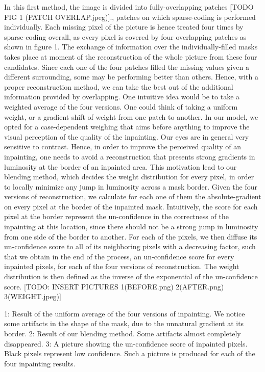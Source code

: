 In this first method, the image is divided into fully-overlapping patches [TODO FIG 1 (PATCH OVERLAP.jpeg)]., patches on which sparse-coding is performed individually. Each missing pixel of the picture is hence treated four times by sparse-coding overall, as every pixel is covered by four overlapping patches as shown in figure 1. 
The exchange of information over the individually-filled masks takes place at moment of the reconstruction of the whole picture from these four candidates. Since each one of the four patches filled the missing values given a different surrounding, some may be performing better than others. Hence, with a proper reconstruction method, we can take the best out of the additional information provided by overlapping.
One intuitive idea would be to take a weighted average of the four versions. One could think of taking a uniform weight, or a gradient shift of weight from one patch to another. In our model, we opted for a case-dependent weighing that aims before anything to improve the visual perception of the quality of the inpainting. 
Our eyes are in general very sensitive to contrast. Hence, in order to improve the perceived quality of an inpainting, one needs to avoid a reconstruction that presents strong gradients in luminosity at the border of an inpainted area. This motivation lead to our blending method, which decides the weight distribution for every pixel, in order to locally minimize any jump in luminosity across a mask border.
Given the four versions of reconstruction, we calculate for each one of them the absolute-gradient on every pixel at the border of the inpainted mask. Intuitively, the score for each pixel at the border represent the un-confidence in the correctness of the inpainting at this location, since there should not be a strong jump in luminosity from one side of the border to another. For each of the pixels, we then diffuse its un-confidence score to all of its neighboring pixels with a decreasing factor, such that we obtain in the end of the process, an un-confidence score for every inpainted pixels, for each of the four versions of reconstruction. The weight distribution is then defined as the inverse of the exponential of the un-confidence score.
[TODO: INSERT PICTURES 1(BEFORE.png) 2(AFTER.png) 3(WEIGHT.jpeg)]

1: Result of the uniform average of the four versions of inpainting. We notice some artifacts in the shape of the mask, due to the unnatural gradient at its border.
2: Result of our blending method. Some artifacts almost completely disappeared.
3: A picture showing the un-confidence score of inpainted pixels. Black pixels represent low confidence. Such a picture is produced for each of the four inpainting results.

